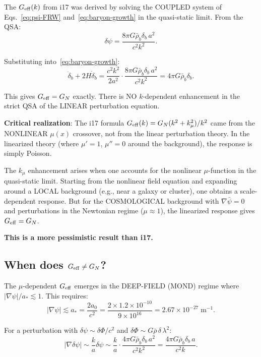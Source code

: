 \documentclass[aps,prd,twocolumn,nofootinbib]{revtex4-2}
\newcommand{\aM}{a_0}
\newcommand{\astar}{a_*}
\newcommand{\ee}[1]{\times 10^{#1}}
\newcommand{\dpsi}{\delta\psi}
\newcommand{\Geff}{G_{\rm eff}}
\newcommand{\kmu}{k_\mu}
\begin{document}
The $\Geff(k)$ from i17 was derived by solving the COUPLED system
of Eqs.~\eqref{eq:psi-FRW} and~\eqref{eq:baryon-growth} in the
quasi-static limit. From the QSA:
\begin{equation}
\dpsi = \frac{8\pi G\bar\rho_b\delta_b\,a^2}{c^2 k^2}.
\end{equation}

Substituting into~\eqref{eq:baryon-growth}:
\begin{equation}
\ddot\delta_b + 2H\dot\delta_b
= \frac{c^2 k^2}{2a^2}\cdot\frac{8\pi G\bar\rho_b\delta_b\,a^2}{c^2 k^2}
= 4\pi G\bar\rho_b\delta_b.
\label{eq:growth-QSA}
\end{equation}

This gives $\Geff = G_N$ exactly. There is NO $k$-dependent
enhancement in the strict QSA of the LINEAR perturbation equation.

\textbf{Critical realization}: The i17 formula
$\Geff(k) = G_N(k^2 + \kmu^2)/k^2$ came from the NONLINEAR
$\mu(x)$ crossover, not from the linear perturbation theory.
In the linearized theory (where $\mu' = 1$, $\mu'' = 0$ around the
background), the response is simply Poisson.

The $\kmu$ enhancement arises when one accounts for the nonlinear
$\mu$-function in the quasi-static limit. Starting from the nonlinear
field equation and expanding around a LOCAL background (e.g., near a
galaxy or cluster), one obtains a scale-dependent response. But for
the COSMOLOGICAL background with $\nabla\bar\psi = 0$ and perturbations
in the Newtonian regime ($\mu \approx 1$), the linearized response
gives $\Geff = G_N$.

\textbf{This is a more pessimistic result than i17.}

\subsection{When does $\Geff \neq G_N$?}

The $\mu$-dependent $\Geff$ emerges in the DEEP-FIELD (MOND) regime
where $|\nabla\psi|/\astar \lesssim 1$. This requires:
\begin{equation}
|\nabla\psi| \lesssim \astar = \frac{2\aM}{c^2}
= \frac{2\times 1.2\ee{-10}}{9\ee{16}}
= 2.67\ee{-27}\;\text{m}^{-1}.
\end{equation}

For a perturbation with $\dpsi \sim \delta\Phi/c^2$ and
$\delta\Phi \sim G\bar\rho\,\delta\,\lambda^2$:
\begin{equation}
|\nabla\dpsi| \sim \frac{k}{a}\dpsi
\sim \frac{k}{a}\cdot\frac{4\pi G\bar\rho_b\delta_b\,a^2}{c^2 k^2}
= \frac{4\pi G\bar\rho_b\delta_b\,a}{c^2 k}.
\end{equation}
\end{document}
